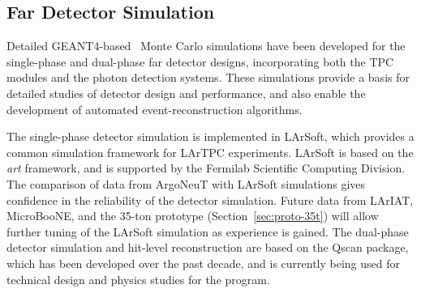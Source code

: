 %

\subsection{Far Detector Simulation}
\label{sec:detectors-sc-physics-software-simulation-fd}

Detailed GEANT4-based~\cite{GEANT4:NIM,GEANT4} Monte Carlo simulations
have been developed for the single-phase and dual-phase far detector
designs, incorporating both the TPC modules and the photon detection
systems. These simulations provide a basis for detailed studies of
detector design and performance, and also enable the development of
automated event-reconstruction algorithms.

The single-phase detector simulation is implemented in
LArSoft\cite{Church:2013hea}, which provides a common simulation
framework for LArTPC experiments.  LArSoft is based on the \textit{art}
framework\cite{Green:2012gv}, and is supported by the Fermilab
Scientific Computing Division.  The comparison of data from
ArgoNeuT\cite{Anderson:2012vc,Anderson:2012mra} with LArSoft
simulations gives confidence in the reliability of the detector
simulation.  Future data from
LArIAT\cite{Adamson:2013/02/28tla,Cavanna:2014iqa},
MicroBooNE\cite{Chen:2007ae,Jones:2011ci,microboonecdr}, and the
35-ton prototype (Section~\ref{sec:proto-35t}) will allow further tuning
of the LArSoft simulation as experience is gained.  The dual-phase
detector simulation and hit-level reconstruction are based on the
Qscan\cite{lussi:thesis} package, which has been developed over the
past decade, and is currently being used for technical design and
physics studies for the \cerndualproto{} program.

